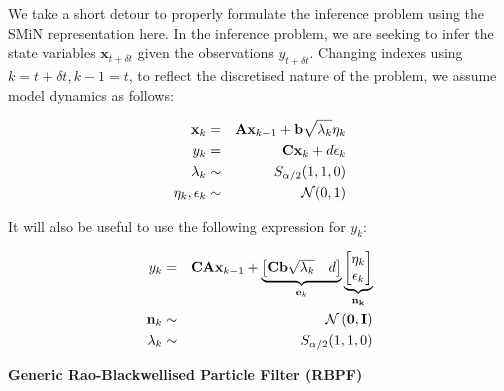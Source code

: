 \documentclass[../main.tex]{subfiles}
\begin{document}
We take a short detour to properly formulate the inference problem using the SMiN representation here. In the inference problem, we are seeking to infer the state variables $\mathbf{x}_{t + \delta t}$ given the observations $y_{t + \delta t}$. Changing indexes using $k = t + \delta t, k-1 = t$, to reflect the discretised nature of the problem, we assume model dynamics as follows:

\begin{eqnarray}
    \mathbf{x}_k & = & \mathbf{A} \mathbf{x}_{k-1} + \mathbf{b} \sqrt{\lambda_k} \eta_k \notag \\
    y_k  & = & \mathbf{C} \mathbf{x}_k + d \epsilon_k \\
    \lambda_k & \sim & S_{\alpha / 2}(1,1,0) \notag \\
    \eta_k, \epsilon_k & \sim & \mathcal{N}(0,1) \notag
    \label{eq:2_2_2_model_dynamics} 
\end{eqnarray}

It will also be useful to use the following expression for $y_k$:

\begin{eqnarray}
    y_k & = & \mathbf{CA} \mathbf{x}_{k-1} + \underbrace{
        \begin{bmatrix}
            \mathbf{Cb} \sqrt{\lambda_k} & d
        \end{bmatrix}
    }_{\mathbf{e}_k} \underbrace{
        \begin{bmatrix}
        \eta_k \\ \epsilon_k
        \end{bmatrix}
    }_{\mathbf{n_k}} \\
    \mathbf{n}_k & \sim & \mathcal{N} \left(
        \mathbf{0}
        , \mathbf{I} \right) \notag \\
    \lambda_k & \sim & S_{\alpha / 2}(1,1,0) \notag
    \label{eq:2_2_2_model_dynamics_y} 
\end{eqnarray}


\textbf{Generic Rao-Blackwellised Particle Filter (RBPF)}
\end{document}
